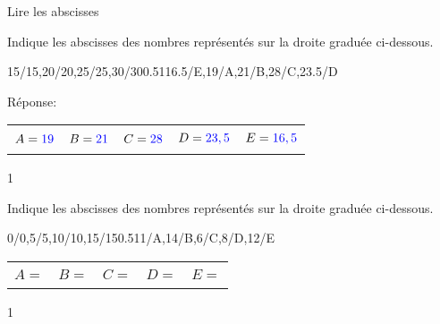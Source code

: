 \documentclass[a4paper,11pt]{report}
\begin{document}
\begin{resolu}{Lire les abscisses}{
Indique les abscisses des nombres représentés sur la droite graduée ci-dessous.
\begin{center}
	\begin{numberlined}{15}{30}{5}{1}{15/15,20/20,25/25,30/30}{0.5}{1}{16.5/E,19/A,21/B,28/C,23.5/D}
\end{numberlined}
\end{center}

Réponse:
\begin{center}
\begin{tabular}{|p{1.9cm}|p{1.9cm}|p{1.9cm}|p{2.2cm}|p{2.2cm}|}\hline
& & & & \\
$A={\color{blue}19}$&$B={\color{blue}21}$&$C={\color{blue}28}$&$D={\color{blue}23,5}$&$E={\color{blue}16,5}$ \\
& & & & \\\hline
\end{tabular}
\end{center}

}{1}
\end{resolu}

\begin{exop}{
Indique les abscisses des nombres représentés sur la droite graduée ci-dessous.
\vspace{-0.2cm}
\begin{center}
\begin{numberlined}{0}{15}{5}{1}{0/0,5/5,10/10,15/15}{0.5}{1}{1/A,14/B,6/C,8/D,12/E}
\end{numberlined}

\begin{tabular}{|p{2.5cm}|p{2.5cm}|p{2.5cm}|p{2.5cm}|p{2.5cm}|}\hline
& & & & \\
$A=$&$B=$&$C=$&$D=$&$E=$ \\
& & & & \\\hline
\end{tabular}
\end{center}
\vspace{-0.5cm}
}{1}\end{exop}
\end{document}
